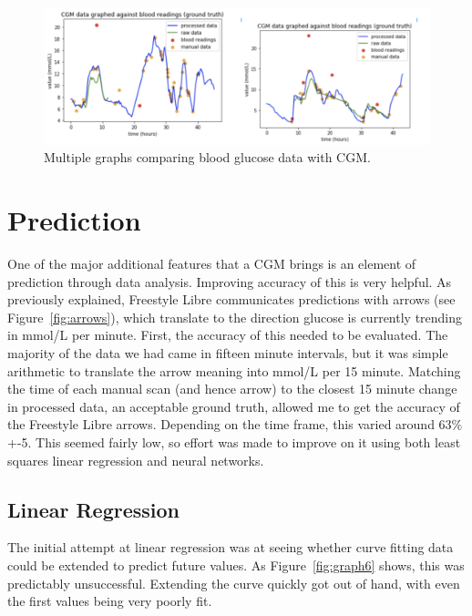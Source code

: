 \begin{figure}[ht]
\centering\includegraphics[width=1.0\linewidth]{images/graph0.png}
\caption{Multiple graphs comparing blood glucose data with CGM.}
\label{fig:graph0}
\end{figure}

\section{Prediction}
One of the major additional features that a CGM brings is an element of prediction through data analysis. Improving accuracy of this is very helpful. As previously explained, Freestyle Libre communicates predictions with arrows (see Figure~\ref{fig:arrows}), which translate to the direction glucose is currently trending in mmol/L per minute. First, the accuracy of this needed to be evaluated. The majority of the data we had came in fifteen minute intervals, but it was simple arithmetic to translate the arrow meaning into mmol/L per 15 minute. Matching the time of each manual scan (and hence arrow) to the closest 15 minute change in processed data, an acceptable ground truth, allowed me to get the accuracy of the Freestyle Libre arrows. Depending on the time frame, this varied around 63\% +-5. This seemed fairly low, so effort was made to improve on it using both least squares linear regression and neural networks.

\subsection{Linear Regression}
The initial attempt at linear regression was at seeing whether curve fitting data could be extended to predict future values. As Figure~\ref{fig:graph6} shows, this was predictably unsuccessful. Extending the curve quickly got out of hand, with even the first values being very poorly fit. 

